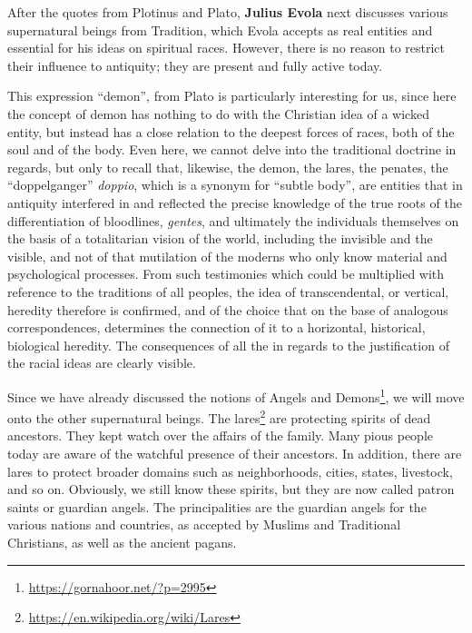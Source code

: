 After the quotes from Plotinus and Plato, \textbf{Julius Evola} next discusses various supernatural beings from Tradition, which Evola accepts as real entities and essential for his ideas on spiritual races. However, there is no reason to restrict their influence to antiquity; they are present and fully active today.

\begin{quotex}
This expression ``demon'', from Plato is particularly interesting for us, since here the concept of demon has nothing to do with the Christian idea of a wicked entity, but instead has a close relation to the deepest forces of races, both of the soul and of the body. Even here, we cannot delve into the traditional doctrine in regards, but only to recall that, likewise, the demon, the lares, the penates, the ``doppelganger'' \emph{doppio}, which is a synonym for ``subtle body'', are entities that in antiquity interfered in and reflected the precise knowledge of the true roots of the differentiation of bloodlines, \emph{gentes}, and ultimately the individuals themselves on the basis of a totalitarian vision of the world, including the invisible and the visible, and not of that mutilation of the moderns who only know material and psychological processes. From such testimonies which could be multiplied with reference to the traditions of all peoples, the idea of transcendental, or vertical, heredity therefore is confirmed, and of the choice that on the base of analogous correspondences, determines the connection of it to a horizontal, historical, biological heredity. The consequences of all the in regards to the justification of the racial ideas are clearly visible.
\end{quotex}


Since we have already discussed the notions of Angels and Demons\footnote{\url{https://gornahoor.net/?p=2995}}, we will move onto the other supernatural beings. The lares\footnote{\url{https://en.wikipedia.org/wiki/Lares}} are protecting spirits of dead ancestors. They kept watch over the affairs of the family. Many pious people today are aware of the watchful presence of their ancestors. In addition, there are lares to protect broader domains such as neighborhoods, cities, states, livestock, and so on. Obviously, we still know these spirits, but they are now called patron saints or guardian angels. The principalities are the guardian angels for the various nations and countries, as accepted by Muslims and Traditional Christians, as well as the ancient pagans.

